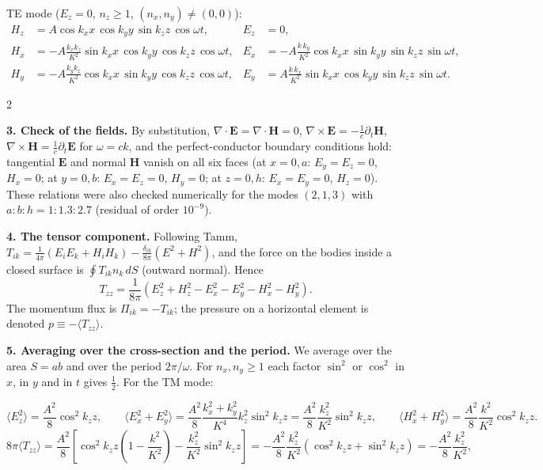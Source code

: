 \documentclass[twoside, 10pt]{article}
\begin{document}
TE mode ($E_z=0$, $n_z\ge1$, $(n_x,n_y)\ne(0,0)$):
\[
\begin{aligned}
H_z&=A\cos k_xx\,\cos k_yy\,\sin k_zz\,\cos\omega t, &
E_z&=0,\\
H_x&=-A\frac{k_xk_z}{K^2}\sin k_xx\,\cos k_yy\,\cos k_zz\,\cos\omega t, &
E_x&=-A\frac{k\,k_y}{K^2}\cos k_xx\,\sin k_yy\,\sin k_zz\,\sin\omega t,\\
H_y&=-A\frac{k_yk_z}{K^2}\cos k_xx\,\sin k_yy\,\cos k_zz\,\cos\omega t, &
E_y&=A\frac{k\,k_x}{K^2}\sin k_xx\,\cos k_yy\,\sin k_zz\,\sin\omega t.
\end{aligned}
\]
\begin{multicols}{2}

\textbf{3. Check of the fields.} By substitution,
$\nabla\cdot\mathbf E=\nabla\cdot\mathbf H=0$,
$\nabla\times\mathbf E=-\frac1c\partial_t\mathbf H$,
$\nabla\times\mathbf H=\frac1c\partial_t\mathbf E$ for $\omega=ck$, and the
perfect-conductor boundary conditions hold: tangential $\mathbf E$ and normal
$\mathbf H$ vanish on all six faces (at $x=0,a$: $E_y=E_z=0$, $H_x=0$; at $y=0,b$:
$E_x=E_z=0$, $H_y=0$; at $z=0,h$: $E_x=E_y=0$, $H_z=0$). These relations were also
checked numerically for the modes $(2,1,3)$ with $a:b:h=1:1.3:2.7$ (residual of
order $10^{-9}$).

\textbf{4. The tensor component.} Following Tamm,
$T_{ik}=\frac1{4\pi}(E_iE_k+H_iH_k)-\frac{\delta_{ik}}{8\pi}(E^2+H^2)$, and the force on
the bodies inside a closed surface is $\oint T_{ik}n_k\,dS$ (outward normal). Hence
\[
T_{zz}=\frac1{8\pi}\left(E_z^2+H_z^2-E_x^2-E_y^2-H_x^2-H_y^2\right).
\]
The momentum flux is $\Pi_{ik}=-T_{ik}$; the pressure on a horizontal element is
denoted $p\equiv-\langle T_{zz}\rangle$.

\textbf{5. Averaging over the cross-section and the period.} We average over the area
$S=ab$ and over the period $2\pi/\omega$. For $n_x,n_y\ge1$ each factor $\sin^2$ or
$\cos^2$ in $x$, in $y$ and in $t$ gives $\tfrac12$. For the TM mode:
\end{multicols}
\[
\langle E_z^2\rangle=\frac{A^2}{8}\cos^2k_zz,\qquad
\langle E_x^2+E_y^2\rangle=\frac{A^2}{8}\frac{k_x^2+k_y^2}{K^4}k_z^2\sin^2k_zz=\frac{A^2}{8}\frac{k_z^2}{K^2}\sin^2k_zz,\qquad
\langle H_x^2+H_y^2\rangle=\frac{A^2}{8}\frac{k^2}{K^2}\cos^2k_zz .
\]
\[
8\pi\langle T_{zz}\rangle=\frac{A^2}{8}\left[\cos^2k_zz\left(1-\frac{k^2}{K^2}\right)-\frac{k_z^2}{K^2}\sin^2k_zz\right]
=-\frac{A^2}{8}\frac{k_z^2}{K^2}\left(\cos^2k_zz+\sin^2k_zz\right)=-\frac{A^2}{8}\frac{k_z^2}{K^2},
\]
\end{document}
